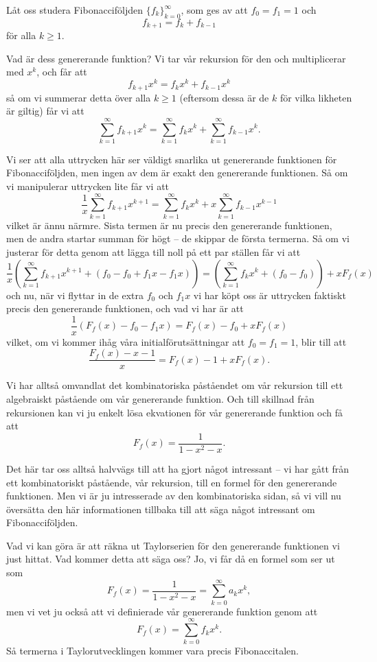 \documentclass[nobib]{tufte-handout}
\begin{document}
\begin{example}
    Låt oss studera Fibonacciföljden $\{f_k\}_{k=0}^\infty$, som ges av att $f_0 = f_1 = 1$ och
    $$f_{k+1} = f_k + f_{k-1}$$
    för alla $k \geq 1$.

    Vad är dess genererande funktion? Vi tar vår rekursion för den och multiplicerar med $x^k$, och får att
    $$f_{k+1} x^k = f_k x^k + f_{k-1} x^k$$
    så om vi summerar detta över alla $k \geq 1$ (eftersom dessa är de $k$ för vilka likheten är giltig) får vi att
    $$\sum_{k=1}^{\infty} f_{k+1}x^k = \sum_{k=1}^{\infty} f_k x^k + \sum_{k=1}^{\infty} f_{k-1}x^k.$$

    Vi ser att alla uttrycken här ser väldigt snarlika ut genererande funktionen för Fibonacciföljden, men ingen av dem är exakt den genererande funktionen. Så om vi manipulerar uttrycken lite får vi att
    $$\frac{1}{x}\sum_{k=1}^{\infty} f_{k+1}x^{k+1} = \sum_{k=1}^{\infty} f_k x^k + x\sum_{k=1}^{\infty} f_{k-1}x^{k-1}$$
    vilket är ännu närmre. Sista termen är nu precis den genererande funktionen, men de andra startar summan för högt -- de skippar de första termerna. Så om vi justerar för detta genom att lägga till noll på ett par ställen får vi att
    $$\frac{1}{x}\left(\sum_{k=1}^{\infty} f_{k+1}x^{k+1} + (f_0 - f_0 + f_1x - f_1x)\right) = \left(\sum_{k=1}^{\infty} f_k x^k + (f_0 - f_0)\right) + xF_f(x)$$
    och nu, när vi flyttar in de extra $f_0$ och $f_1x$ vi har köpt oss är uttrycken faktiskt precis den genererande funktionen, och vad vi har är att
    $$\frac{1}{x}\left(F_f(x) - f_0 - f_1x\right) = F_f(x) - f_0 + xF_f(x)$$
    vilket, om vi kommer ihåg våra initialförutsättningar att $f_0 = f_1 = 1$, blir till att
    $$\frac{F_f(x) - x - 1}{x} = F_f(x) - 1 + xF_f(x).$$

    Vi har alltså omvandlat det kombinatoriska påståendet om vår rekursion till ett algebraiskt påstående om vår genererande funktion. Och till skillnad från rekursionen kan vi ju enkelt lösa ekvationen för vår genererande funktion och få att
    $$F_f(x) = \frac{1}{1 - x^2 - x}.$$
\end{example}

Det här tar oss alltså halvvägs till att ha gjort något intressant -- vi har gått från ett kombinatoriskt påstående, vår rekursion, till en formel för den genererande funktionen. Men vi är ju intresserade av den kombinatoriska sidan, så vi vill nu översätta den här informationen tillbaka till att säga något intressant om Fibonacciföljden.

Vad vi kan göra är att räkna ut Taylorserien för den genererande funktionen vi just hittat. Vad kommer detta att säga oss? Jo, vi får då en formel som ser ut som
$$F_f(x) = \frac{1}{1 - x^2 - x} = \sum_{k = 0}^{\infty} a_k x^k,$$
men vi vet ju också att vi definierade vår genererande funktion genom att
$$F_f(x) = \sum_{k = 0}^{\infty} f_kx^k.$$
Så termerna i Taylorutvecklingen kommer vara precis Fibonaccitalen.
\end{document}
